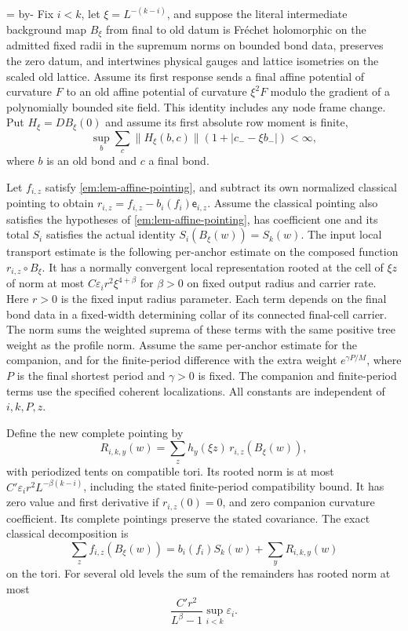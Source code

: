\documentclass[11pt,letterpaper,reqno]{amsart}
\makeatletter
\numberwithin{equation}{section}
\newcommand{\emneedspace}[1]{\par\begingroup
  \dimen0=\pagegoal\advance\dimen0 by-\pagetotal
  \ifdim\dimen0<#1\relax\newpage\fi\endgroup}
\theoremstyle{definition}
\newcommand{\ms@minorstart}{%
  \pushQED{\qed}\renewcommand{\qedsymbol}{$\blacksquare$}}
\newenvironment{proposition}[1][]{\ms@minorstart\ms@proposition[#1]}
  {\popQED\endms@proposition}
\theoremstyle{remark}
\makeatother
\begin{document}
\emneedspace{8\baselineskip}
\begin{proposition}[Transport after summing old anchors]
\label{em:prop-anchor-transport}
Fix \(i<k\), let \(\xi=L^{-(k-i)}\), and suppose the literal
intermediate background map \(B_\xi\) from final to old datum is
Fr\'echet holomorphic on the admitted fixed radii in the supremum
norms on bounded bond data, preserves the zero datum,
and intertwines
physical gauges and lattice isometries on the scaled old lattice.
Assume its first response sends a final affine potential of curvature
\(F\) to an old affine potential of curvature \(\xi^2F\) modulo
the gradient of a polynomially bounded site field. This identity
includes any node frame change. Put $H_\xi=DB_\xi(0)$ and assume
its first absolute row moment is finite,
\[
 \sup_b\sum_c\|H_\xi(b,c)\|
              (1+|c_--\xi b_-|)<\infty,
\]
where $b$ is an old bond and $c$ a final bond. 


Let \(f_{i,z}\) satisfy \cref{em:lem-affine-pointing}, and subtract
its own normalized classical pointing to obtain
\(r_{i,z}=f_{i,z}-b_i(f_i)\mathsf e_{i,z}\). Assume the classical
pointing also satisfies the hypotheses of
\cref{em:lem-affine-pointing}, has coefficient one and its total
\(S_i\) satisfies the
actual identity \(S_i(B_\xi(w))=S_k(w)\). The input local transport
estimate is the following per-anchor estimate on the composed
function \(r_{i,z}\circ B_\xi\). It has a normally convergent local
representation rooted at the cell of \(\xi z\) of norm at most
\(C\varepsilon_i r^2\xi^{4+\beta}\) for \(\beta>0\) on fixed
output radius and carrier rate. Here \(r>0\) is the fixed input
radius parameter. Each term depends on the final bond data in a
fixed-width determining collar of its connected final-cell carrier.
The norm sums the weighted suprema of these terms with the same
positive tree weight as the profile norm. Assume the same
per-anchor estimate for the companion, and for the finite-period
difference with the extra weight \(e^{\gamma P/M}\), where \(P\)
is the final shortest period and \(\gamma>0\) is fixed. The
companion and finite-period terms use the specified coherent
localizations. All constants are independent of \(i,k,P,z\).

Define the new complete pointing by
\begin{equation}\label{em:eq-anchor-transport}
 R_{i,k,y}(w)=\sum_z h_y(\xi z)\,r_{i,z}(B_\xi(w)),
\end{equation}
with periodized tents on compatible tori. Its rooted norm is at most
\(C'\varepsilon_i r^2 L^{-\beta(k-i)}\), including the stated
finite-period compatibility bound. It has zero value and first
derivative if \(r_{i,z}(0)=0\), and zero companion curvature
coefficient. Its complete pointings preserve the stated covariance.
The exact classical decomposition is
\[
 \sum_z f_{i,z}(B_\xi(w))= b_i(f_i)S_k(w)+\sum_y R_{i,k,y}(w)
\]
on the tori. For several old levels the sum of the remainders has
rooted norm at most
\[
                 \frac{C'r^2}{L^\beta-1}\sup_{i<k}\varepsilon_i.
\]
\end{proposition}
\end{document}
